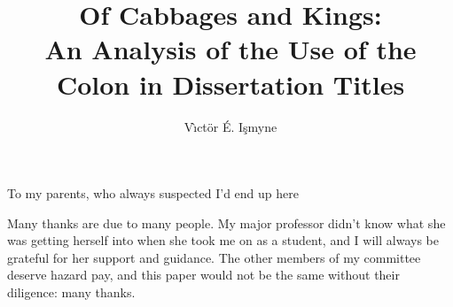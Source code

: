 \documentclass[11pt,copyright,expanded]{fsuthesis}
\title{Of Cabbages and Kings:\protect\\
  An Analysis of the Use of the Colon in Dissertation Titles}
\author{V\`\i ct\"or \'E. I\c smyne}  %
\begin{document}
\frontmatter          %


\maketitle            %
\makecommitteepage    %


\begin{dedication}
\centering
To my parents, who always suspected I'd end up here
\end{dedication}


\begin{acknowledgments}
Many thanks are due to many people.  My major professor didn't
know what she was getting herself into when she took me on as
a student, and I will always be grateful for her support and
guidance.  The other members of my committee deserve hazard pay,
and this paper would not be the same without their diligence:
many thanks.
\end{acknowledgments}


\tableofcontents
\listoftables
\listoffigures
\end{document}
